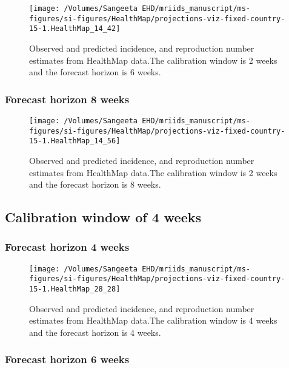 \documentclass[11pt,]{article}
\begin{document}
\begin{figure}

  {
    \centering \texttt{[image: /Volumes/Sangeeta EHD/mriids\_manuscript/ms-figures/si-figures/HealthMap/projections-viz-fixed-country-15-1.HealthMap\_14\_42]} 
  }
  \caption{Observed and predicted incidence, and
    reproduction number estimates from HealthMap data.The calibration
    window is 2 weeks and the forecast horizon is 6 weeks.}
    \label{fig:hm26}
\end{figure}

\hypertarget{forecast-horizon-8-weeks-3}{%
  \subsubsection{Forecast horizon 8 weeks}\label{forecast-horizon-8-weeks-3}}

\begin{figure}
  {
    \centering \texttt{[image: /Volumes/Sangeeta EHD/mriids\_manuscript/ms-figures/si-figures/HealthMap/projections-viz-fixed-country-15-1.HealthMap\_14\_56]} 
  }
  \caption{Observed and predicted incidence, and reproduction number
    estimates from HealthMap data.The calibration window is 2 weeks
    and the forecast horizon is 8 weeks.}
    \label{fig:hm28}
\end{figure}

\hypertarget{calibration-window-of-4-weeks-1}{%
  \subsection{Calibration window of 4 weeks}\label{calibration-window-of-4-weeks-1}}

\hypertarget{forecast-horizon-4-weeks-3}{%
  \subsubsection{Forecast horizon 4 weeks}\label{forecast-horizon-4-weeks-3}}

\begin{figure}
  {
    \centering \texttt{[image: /Volumes/Sangeeta EHD/mriids\_manuscript/ms-figures/si-figures/HealthMap/projections-viz-fixed-country-15-1.HealthMap\_28\_28]} 
  }
  \caption{Observed and predicted incidence, and reproduction number
    estimates from HealthMap data.The calibration window is 4 weeks
    and the forecast horizon is 4 weeks.}
      \label{fig:hm44}
\end{figure}

\hypertarget{forecast-horizon-6-weeks-4}{%
  \subsubsection{Forecast horizon 6 weeks}\label{forecast-horizon-6-weeks-4}}
\end{document}
